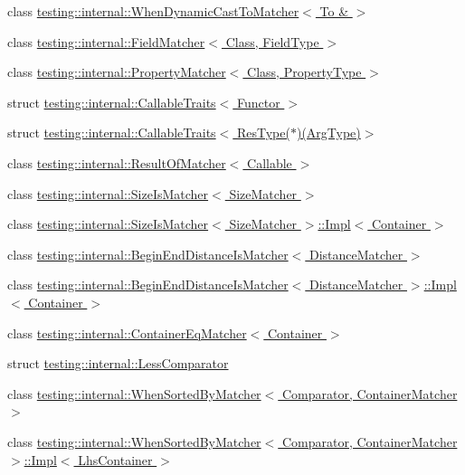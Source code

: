 \begin{DoxyCompactItemize}
\item 
class \hyperlink{classtesting_1_1internal_1_1_when_dynamic_cast_to_matcher_3_01_to_01_6_01_4}{testing\+::internal\+::\+When\+Dynamic\+Cast\+To\+Matcher$<$ To \& $>$}
\item 
class \hyperlink{classtesting_1_1internal_1_1_field_matcher}{testing\+::internal\+::\+Field\+Matcher$<$ Class, Field\+Type $>$}
\item 
class \hyperlink{classtesting_1_1internal_1_1_property_matcher}{testing\+::internal\+::\+Property\+Matcher$<$ Class, Property\+Type $>$}
\item 
struct \hyperlink{structtesting_1_1internal_1_1_callable_traits}{testing\+::internal\+::\+Callable\+Traits$<$ Functor $>$}
\item 
struct \hyperlink{structtesting_1_1internal_1_1_callable_traits_3_01_res_type_07_5_08_07_arg_type_08_4}{testing\+::internal\+::\+Callable\+Traits$<$ Res\+Type($\ast$)(\+Arg\+Type)$>$}
\item 
class \hyperlink{classtesting_1_1internal_1_1_result_of_matcher}{testing\+::internal\+::\+Result\+Of\+Matcher$<$ Callable $>$}
\item 
class \hyperlink{classtesting_1_1internal_1_1_size_is_matcher}{testing\+::internal\+::\+Size\+Is\+Matcher$<$ Size\+Matcher $>$}
\item 
class \hyperlink{classtesting_1_1internal_1_1_size_is_matcher_1_1_impl}{testing\+::internal\+::\+Size\+Is\+Matcher$<$ Size\+Matcher $>$\+::\+Impl$<$ Container $>$}
\item 
class \hyperlink{classtesting_1_1internal_1_1_begin_end_distance_is_matcher}{testing\+::internal\+::\+Begin\+End\+Distance\+Is\+Matcher$<$ Distance\+Matcher $>$}
\item 
class \hyperlink{classtesting_1_1internal_1_1_begin_end_distance_is_matcher_1_1_impl}{testing\+::internal\+::\+Begin\+End\+Distance\+Is\+Matcher$<$ Distance\+Matcher $>$\+::\+Impl$<$ Container $>$}
\item 
class \hyperlink{classtesting_1_1internal_1_1_container_eq_matcher}{testing\+::internal\+::\+Container\+Eq\+Matcher$<$ Container $>$}
\item 
struct \hyperlink{structtesting_1_1internal_1_1_less_comparator}{testing\+::internal\+::\+Less\+Comparator}
\item 
class \hyperlink{classtesting_1_1internal_1_1_when_sorted_by_matcher}{testing\+::internal\+::\+When\+Sorted\+By\+Matcher$<$ Comparator, Container\+Matcher $>$}
\item 
class \hyperlink{classtesting_1_1internal_1_1_when_sorted_by_matcher_1_1_impl}{testing\+::internal\+::\+When\+Sorted\+By\+Matcher$<$ Comparator, Container\+Matcher $>$\+::\+Impl$<$ Lhs\+Container $>$}

\end{DoxyCompactItemize}

